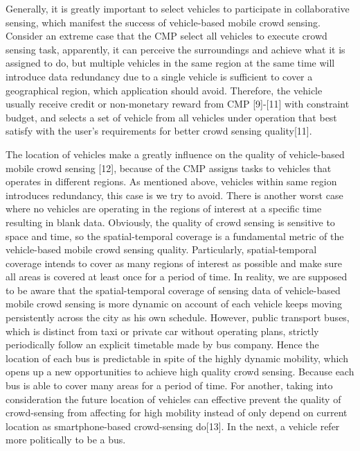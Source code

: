 \documentclass[journal]{IEEEtran}
\begin{document}
Generally, it is greatly important to select vehicles to participate in collaborative sensing, which manifest the success of vehicle-based mobile crowd sensing. Consider an extreme case that the CMP select all vehicles to execute crowd sensing task, apparently, it can perceive the surroundings and achieve what it is assigned to do, but multiple vehicles in the same region at the same time will introduce data redundancy due to a single vehicle is sufficient to cover a geographical region, which application should avoid. Therefore, the vehicle usually receive credit or non-monetary reward from CMP [9]-[11] with constraint budget, and selects a set of vehicle from all vehicles under operation that best satisfy with the user’s requirements for better crowd sensing quality[11].


The location of vehicles make a greatly influence on the quality of vehicle-based mobile crowd sensing [12], because of the CMP assigns tasks to vehicles that operates in different regions. As mentioned above, vehicles within same region introduces redundancy, this case is we try to avoid. There is another worst case where no vehicles are operating in the regions of interest at a specific time resulting in blank data. Obviously, the quality of crowd sensing is sensitive to space and time, so the spatial-temporal coverage is a fundamental metric of the vehicle-based mobile crowd sensing quality. Particularly, spatial-temporal coverage intends to cover as many regions of interest as possible and make sure all areas is covered at least once for a period of time. In reality, we are supposed to be aware that the spatial-temporal coverage of sensing data of vehicle-based mobile crowd sensing is more dynamic on account of each vehicle keeps moving persistently across the city as his own schedule. 
However, public transport buses, which is distinct from taxi or private car without operating plans, strictly periodically follow an explicit timetable made by bus company. Hence the location of each bus is predictable in spite of the highly dynamic mobility, which opens up a new opportunities to achieve high quality crowd sensing. Because each bus is able to cover many areas for a period of time. For another, taking into consideration the future location of vehicles can effective prevent the quality of crowd-sensing from affecting for high mobility instead of only depend on current location as smartphone-based crowd-sensing do[13]. In the next, a vehicle refer more politically to be a bus. 
\end{document}
